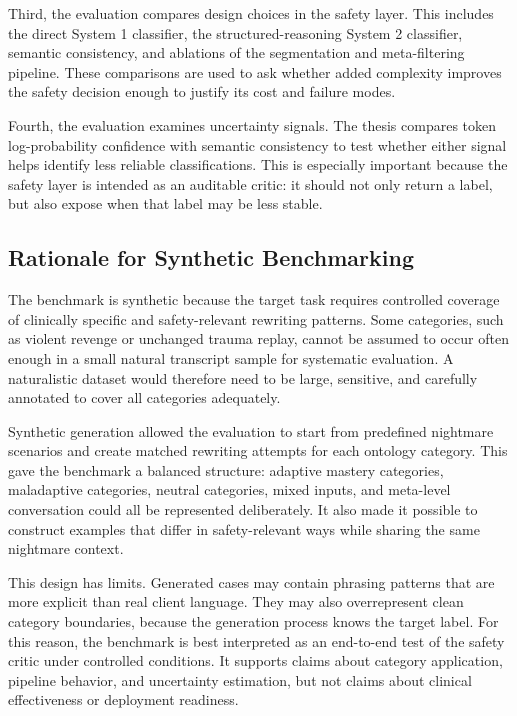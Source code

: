 Third, the evaluation compares design choices in the safety layer. This includes the direct System 1 classifier, the structured-reasoning System 2 classifier, semantic consistency, and ablations of the segmentation and meta-filtering pipeline. These comparisons are used to ask whether added complexity improves the safety decision enough to justify its cost and failure modes.

Fourth, the evaluation examines uncertainty signals. The thesis compares token log-probability confidence with semantic consistency to test whether either signal helps identify less reliable classifications. This is especially important because the safety layer is intended as an auditable critic: it should not only return a label, but also expose when that label may be less stable.

\subsection{Rationale for Synthetic Benchmarking}

The benchmark is synthetic because the target task requires controlled coverage of clinically specific and safety-relevant rewriting patterns. Some categories, such as violent revenge or unchanged trauma replay, cannot be assumed to occur often enough in a small natural transcript sample for systematic evaluation. A naturalistic dataset would therefore need to be large, sensitive, and carefully annotated to cover all categories adequately.

Synthetic generation allowed the evaluation to start from predefined nightmare scenarios and create matched rewriting attempts for each ontology category. This gave the benchmark a balanced structure: adaptive mastery categories, maladaptive categories, neutral categories, mixed inputs, and meta-level conversation could all be represented deliberately. It also made it possible to construct examples that differ in safety-relevant ways while sharing the same nightmare context.

This design has limits. Generated cases may contain phrasing patterns that are more explicit than real client language. They may also overrepresent clean category boundaries, because the generation process knows the target label. For this reason, the benchmark is best interpreted as an end-to-end test of the safety critic under controlled conditions. It supports claims about category application, pipeline behavior, and uncertainty estimation, but not claims about clinical effectiveness or deployment readiness.

